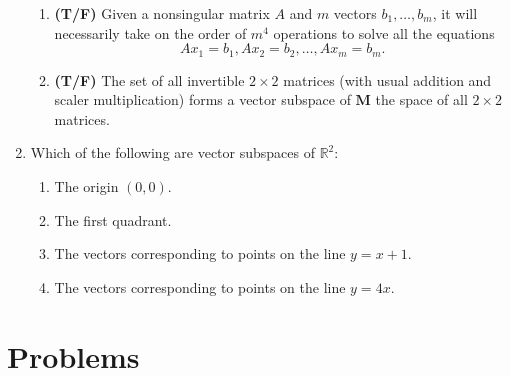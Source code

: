 \documentclass[11pt]{article}
\newcommand{\rr}{\mathbb{R}}
\begin{document}
\begin{enumerate}
\begin{enumerate}
\item \textbf{(T/F)} Given a nonsingular matrix $A$ and $m$ vectors $b_1, \ldots, b_m$, it will necessarily take on the order of $m^4$ operations to solve all the equations 
\[Ax_1 = b_1, Ax_2 = b_2, \ldots, Ax_m = b_m. \]

\item \textbf{(T/F)} The set of all invertible $2 \times 2$ matrices (with usual addition and scaler multiplication) forms a vector subspace of $\mathbf{M}$ the space of all $2 \times 2$ matrices.

\end{enumerate}

\item Which of the following are vector subspaces of $\rr^2$:

\begin{enumerate}

\item The origin $(0,0)$.
\item The first quadrant.
\item The vectors corresponding to points on the line $y = x + 1$.
\item The vectors corresponding to points on the line $y = 4x$.

\end{enumerate}


\end{enumerate}

\section{Problems}
\end{document}
